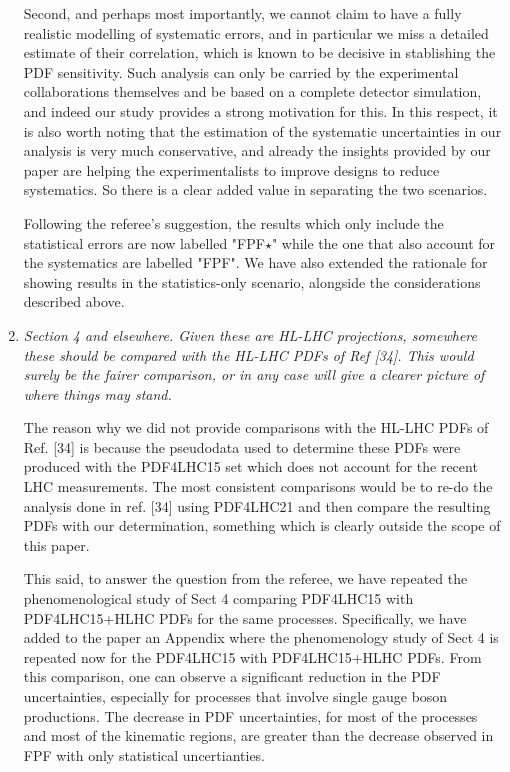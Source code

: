 \documentclass[11pt,a4paper]{article}
\begin{document}
\begin{enumerate}
        Second, and perhaps most importantly, we cannot claim to have a fully realistic modelling
        of systematic errors, and in particular we miss a detailed estimate of their correlation, which
        is known to be decisive in stablishing the PDF sensitivity.
        Such analysis can only be carried by the experimental collaborations themselves and
        be based on a complete detector simulation, and indeed our study provides
        a strong motivation for this.
        In this respect,  it is also worth noting that the estimation of the systematic uncertainties in our 
	analysis is very  much conservative, and already the insights provided by our paper
        are helping the experimentalists to improve designs to reduce systematics.
        So there is a clear added value in separating the two scenarios.
        	
	Following the referee's suggestion, the results which only include the statistical errors
	are now labelled "FPF$\star$" while the one that also account for the systematics are labelled "FPF".
        We have also extended the rationale for showing results in the statistics-only scenario, alongside the
        considerations described above.
	
	\item {\it Section 4 and elsewhere. Given these are HL-LHC projections, somewhere these should
		be compared with the HL-LHC PDFs of Ref [34]. This would surely be the fairer
		comparison, or in any case will give a clearer picture of where things may stand.
	}
	
	The reason why we did not provide comparisons with the HL-LHC PDFs of Ref. [34] is because
	the pseudodata used to determine these PDFs were produced with the PDF4LHC15 set which
	does not account for the recent LHC measurements. The most consistent comparisons would
	be to re-do the analysis done in ref. [34] using PDF4LHC21 and then compare the resulting PDFs 
	with our determination, something which is clearly outside the scope of this paper.

        This said, to answer the question from the referee, we have repeated the phenomenological study of Sect 4
        comparing PDF4LHC15 with PDF4LHC15+HLHC PDFs for the same processes.
        Specifically, we have added to the paper an Appendix where the phenomenology study of Sect 4 is repeated
        now for the PDF4LHC15 with PDF4LHC15+HLHC PDFs.
        From this comparison, one can observe a significant reduction in the PDF uncertainties, especially for
        processes that involve single gauge boson productions. The decrease in PDF uncertainties, for most of
        the processes and most of the kinematic regions, are greater than the decrease observed in FPF with only
        statistical uncertianties.


\end{enumerate}
\end{document}
